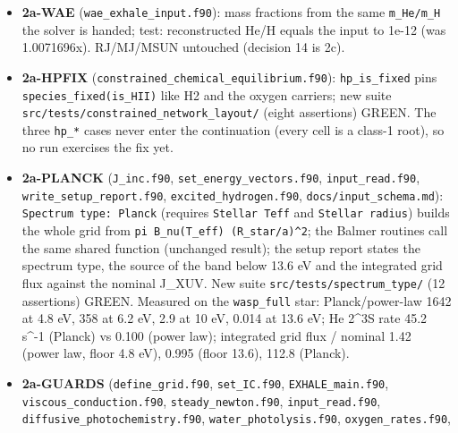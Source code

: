 \documentclass[english,a4paper]{my_memo}
\begin{document}
\begin{itemize}
  new \texttt{nHI} argument required): band B2 is attenuated by
  \texttt{lya\_stellar\_beam\_transmission(T,\ tau)} = \texttt{erfc(x1/(sqrt(2)\ X\_s))}, the
  expression \texttt{jlya\_escape\_prob} carried inline and now calls (bitwise equal
  at 4941 test points). Test \texttt{lya\_band\_transmission.f90} (ten assertions)
  GREEN. Movement, \texttt{oxygen\_chemistry} 1000-step snapshot: du 903 -\textgreater{} 596,
  log10 Mdot 9.62 -\textgreater{} 9.61, B2 transmission 1e-291 at the base, 1e-3 at
  1.07 R\_p, 0.98 at 1.5 R\_p; H2O moves up to 6.2x and OH 7.3x in the
  layer. Scratch baseline of that case re-snapshotted (previous copy kept).
\item
  \textbf{2a-WAE} (\texttt{wae\_exhale\_input.f90}): mass fractions from the same
  \texttt{m\_He/m\_H} the solver is handed; test: reconstructed He/H equals the input
  to 1e-12 (was 1.0071696x). RJ/MJ/MSUN untouched (decision 14 is 2c).
\item
  \textbf{2a-HPFIX} (\texttt{constrained\_chemical\_equilibrium.f90}): \texttt{hp\_is\_fixed}
  pins \texttt{species\_fixed(is\_HII)} like H2 and the oxygen carriers; new suite
  \texttt{src/tests/constrained\_network\_layout/} (eight assertions) GREEN. The three
  \texttt{hp\_*} cases never enter the continuation (every cell is a class-1 root),
  so no run exercises the fix yet.
\item
  \textbf{2a-PLANCK} (\texttt{J\_inc.f90}, \texttt{set\_energy\_vectors.f90}, \texttt{input\_read.f90},
  \texttt{write\_setup\_report.f90}, \texttt{excited\_hydrogen.f90}, \texttt{docs/input\_schema.md}):
  \texttt{Spectrum\ type:\ Planck} (requires \texttt{Stellar\ Teff} and \texttt{Stellar\ radius})
  builds the whole grid from \texttt{pi\ B\_nu(T\_eff)\ (R\_star/a)\^{}2}; the Balmer
  routines call the same shared function (unchanged result); the setup
  report states the spectrum type, the source of the band below 13.6 eV and
  the integrated grid flux against the nominal J\_XUV. New suite
  \texttt{src/tests/spectrum\_type/} (12 assertions) GREEN. Measured on the
  \texttt{wasp\_full} star: Planck/power-law 1642 at 4.8 eV, 358 at 6.2 eV, 2.9 at
  10 eV, 0.014 at 13.6 eV; He 2\^{}3S rate 45.2 s\^{}-1 (Planck) vs 0.100
  (power law); integrated grid flux / nominal 1.42 (power law, floor 4.8 eV),
  0.995 (floor 13.6), 112.8 (Planck).
\item
  \textbf{2a-GUARDS} (\texttt{define\_grid.f90}, \texttt{set\_IC.f90}, \texttt{EXHALE\_main.f90},
  \texttt{viscous\_conduction.f90}, \texttt{steady\_newton.f90}, \texttt{input\_read.f90},
  \texttt{diffusive\_photochemistry.f90}, \texttt{water\_photolysis.f90}, \texttt{oxygen\_rates.f90},

\end{itemize}
\end{document}
